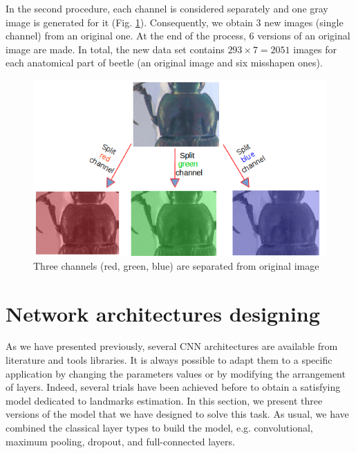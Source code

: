 \documentclass[review]{elsarticle}
\begin{document}
In the second procedure, each channel is considered separately and one
gray image is generated for it (Fig. \ref{figaug2}). Consequently, we
obtain 3 new images (single channel) from an original one. At the end
of the process, $6$ versions of an original image are made. In total,
the new data set contains $293 \times 7 = 2051$ images for each
anatomical part of beetle (an original image and six misshapen ones).


\begin{figure}[h]
	\centering
	\includegraphics[scale=0.4]{images/sp_channels}
	\caption{Three channels (red, green, blue) are separated from original image}
	\label{figaug2}
\end{figure}

\section{Network architectures designing}
\label{Sneuralnetwork}
As we have presented previously, several CNN architectures are
available from literature and tools libraries. It is always possible
to adapt them to a specific application by changing the parameters
values or by modifying the arrangement of layers. Indeed, several
trials have been achieved before to obtain a satisfying model
dedicated to landmarks estimation. In this section, we present three
versions of the model that we have designed to solve this task. As
usual, we have combined the classical layer types to build the model,
e.g. convolutional, maximum pooling, dropout, and full-connected
layers.
\end{document}
